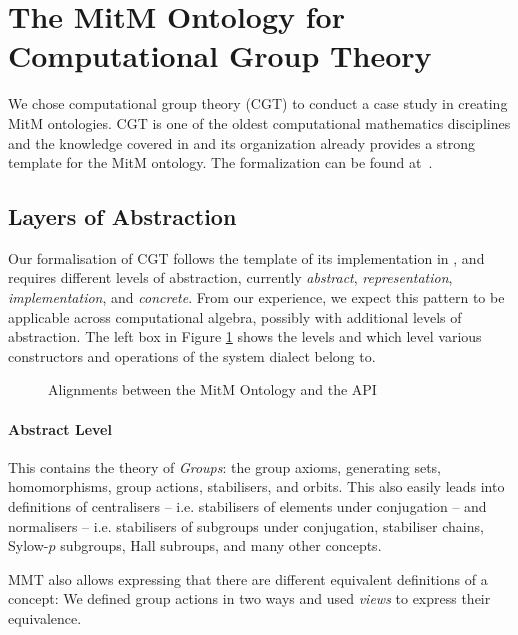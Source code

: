 \section{The MitM Ontology for Computational Group Theory}\label{sec:cgt}

We chose computational group theory (CGT) to conduct a case study in creating MitM
ontologies. CGT is one of the oldest computational mathematics disciplines and the
knowledge covered in \GAP and its organization already provides a strong template for the
MitM ontology. The formalization can be found at~\cite{mitm:groups:on}. 

\subsection{Layers of Abstraction}

Our formalisation of CGT follows the template of its implementation in \GAP, and requires
different levels of abstraction, currently \emph{abstract}, \emph{representation},
\emph{implementation}, and \emph{concrete}.  From our experience, we expect this pattern
to be applicable across computational algebra, possibly with additional levels of
abstraction. The left box in Figure \ref{fig:cgtontology} shows the levels and which level
various constructors and operations of the \GAP system dialect belong to.

\begin{figure}[ht]\centering
  \caption{Alignments between the MitM Ontology and the \GAP API}\label{fig:cgtontology}
\end{figure}
\paragraph{Abstract Level} This contains the theory of \emph{Groups}: the group axioms, generating sets, homomorphisms, group actions, stabilisers, and orbits.  
This also easily leads into definitions of centralisers -- i.e. stabilisers of elements under conjugation -- and normalisers -- i.e. stabilisers of subgroups under conjugation, stabiliser chains, Sylow-$p$ subgroups, Hall subroups, and many other concepts.

MMT also allows expressing that there are different equivalent definitions of a
concept: We defined group actions in two ways and used \emph{views} to express
their equivalence.

